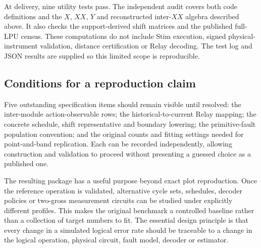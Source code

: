 \documentclass[11pt,a4paper]{article}
\begin{document}
At delivery, nine utility tests pass. The independent audit covers both code definitions and the $X$, $XX$, $Y$ and reconstructed inter-$XX$ algebra described above. It also checks the support-derived shift matrices and the published full-LPU census. These computations do not include Stim execution, signed physical-instrument validation, distance certification or Relay decoding. The test log and JSON results are supplied so this limited scope is reproducible.

\subsection{Conditions for a reproduction claim}

Five outstanding specification items should remain visible until resolved: the inter-module action-observable rows; the historical-to-current Relay mapping; the concrete schedule, shift representative and boundary lowering; the primitive-fault population convention; and the original counts and fitting settings needed for point-and-band replication. Each can be recorded independently, allowing construction and validation to proceed without presenting a guessed choice as a published one.

The resulting package has a useful purpose beyond exact plot reproduction. Once the reference operation is validated, alternative cycle sets, schedules, decoder policies or two-gross measurement circuits can be studied under explicitly different profiles. This makes the original benchmark a controlled baseline rather than a collection of target numbers to fit. The essential design principle is that every change in a simulated logical error rate should be traceable to a change in the logical operation, physical circuit, fault model, decoder or estimator.
\end{document}
